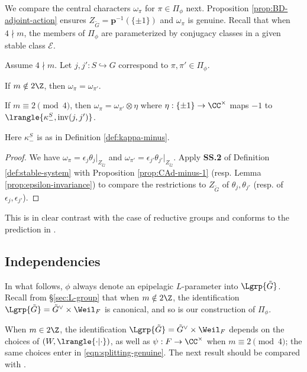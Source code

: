 \documentclass[a4paper,10pt]{article}
\begin{document}
We compare the central characters $\omega_\pi$ for $\pi \in \Pi_\phi$ next. Proposition \ref{prop:BD-adjoint-action} ensures $Z_{\tilde{G}} = \bm{p}^{-1}(\{\pm 1\})$ and $\omega_\pi$ is genuine. Recall that when $4 \nmid m$, the members of $\Pi_\phi$ are parameterized by conjugacy classes in a given stable class $\mathcal{E}$.

\begin{theorem}\label{prop:central-character}
	Assume $4 \nmid m$. Let $j,j': S \hookrightarrow G$ correspond to $\pi, \pi' \in \Pi_\phi$.
	\begin{compactitem}
		\item If $m \notin 2\Z$, then $\omega_\pi = \omega_{\pi'}$.
		\item If $m \equiv 2 \pmod 4$, then $\omega_\pi = \omega_{\pi'} \otimes \eta$ where $\eta: \{\pm 1\} \to \CC^\times$ maps $-1$ to $\lrangle{ \kappa^S_-, \mathrm{inv}(j,j')}$.
	\end{compactitem}
	Here $\kappa^S_-$ is as in Definition \ref{def:kappa-minus}.
\end{theorem}
\begin{proof}
	We have $\omega_\pi = \epsilon_j \theta_j|_{Z_{\tilde{G}}}$ and $\omega_{\pi'} = \epsilon_{j'} \theta_{j'}|_{Z_{\tilde{G}}}$. Apply \textbf{SS.2} of Definition \ref{def:stable-system} with Proposition \ref{prop:CAd-minus-1} (resp. Lemma \ref{prop:epsilon-invariance}) to compare the restrictions to $Z_{\tilde{G}}$ of $\theta_j, \theta_{j'}$ (resp. of $\epsilon_j, \epsilon_{j'}$).
\end{proof}
This is in clear contrast with the case of reductive groups and conforms to the prediction in \cite[\S 12.1]{GG}.

\subsection{Independencies}\label{sec:independence}
In what follows, $\phi$ always denote an epipelagic $L$-parameter into $\Lgrp{\tilde{G}}$. Recall from \S\ref{sec:L-group} that when $m \notin 2\Z$, the identification $\Lgrp{\tilde{G}} = \tilde{G}^\vee \times \Weil_F$ is canonical, and so is our construction of $\Pi_\phi$.

When $m \in 2\Z$, the identification $\Lgrp{\tilde{G}} = \tilde{G}^\vee \times \Weil_F$ depends on the choices of $(W, \lrangle{\cdot|\cdot})$, as well as $\psi: F \to \CC^\times$ when $m \equiv 2 \pmod 4$; the same choices enter in \eqref{eqn:splitting-genuine}. The next result should be compared with \cite[Proposition 11.1]{GG}.
\end{document}
